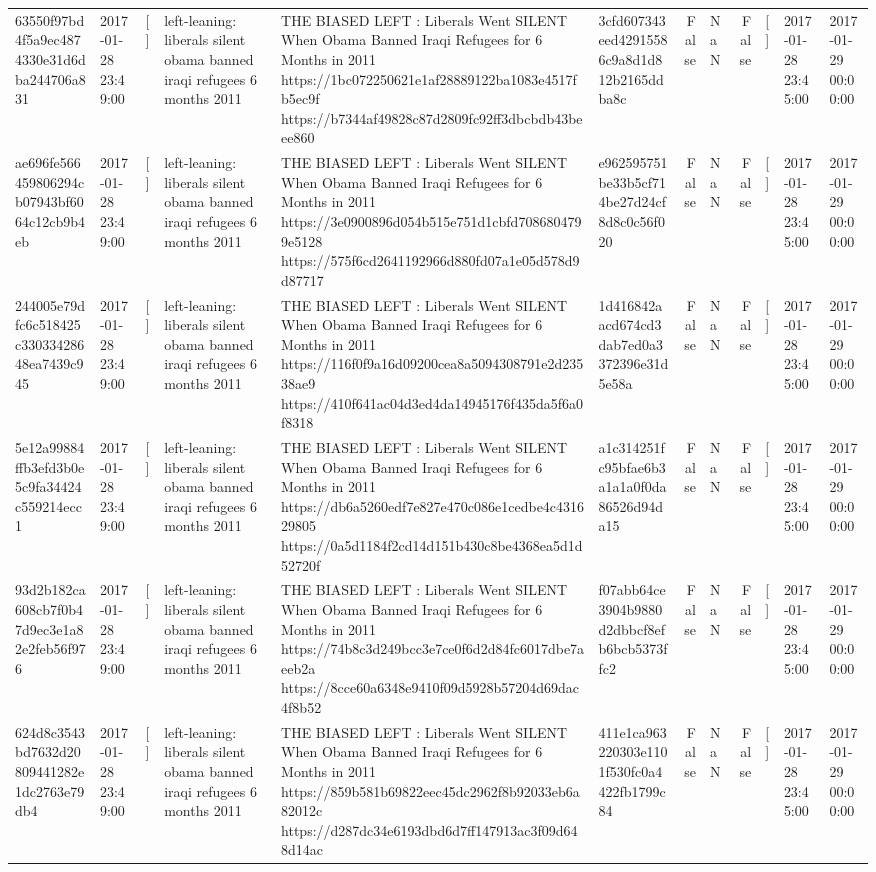 \begin{tabular}{llllllrlrlll}
63550f97bd4f5a9ec4874330e31d6dba244706a831 & 2017-01-28 23:49:00 & [] & left-leaning: liberals silent obama banned iraqi refugees 6 months 2011 & THE BIASED LEFT : Liberals Went SILENT When Obama Banned Iraqi Refugees for 6 Months in 2011 https://1bc072250621e1af28889122ba1083e4517fb5ec9f https://b7344af49828c87d2809fc92ff3dbcbdb43beee860 & 3cfd607343eed42915586c9a8d1d812b2165ddba8c & False & NaN & False & [] & 2017-01-28 23:45:00 & 2017-01-29 00:00:00 \\
ae696fe566459806294cb07943bf6064c12cb9b4eb & 2017-01-28 23:49:00 & [] & left-leaning: liberals silent obama banned iraqi refugees 6 months 2011 & THE BIASED LEFT : Liberals Went SILENT When Obama Banned Iraqi Refugees for 6 Months in 2011 https://3e0900896d054b515e751d1cbfd7086804799e5128 https://575f6cd2641192966d880fd07a1e05d578d9d87717 & e962595751be33b5cf714be27d24cf8d8c0c56f020 & False & NaN & False & [] & 2017-01-28 23:45:00 & 2017-01-29 00:00:00 \\
244005e79dfc6c518425c33033428648ea7439c945 & 2017-01-28 23:49:00 & [] & left-leaning: liberals silent obama banned iraqi refugees 6 months 2011 & THE BIASED LEFT : Liberals Went SILENT When Obama Banned Iraqi Refugees for 6 Months in 2011 https://116f0f9a16d09200cea8a5094308791e2d23538ae9 https://410f641ac04d3ed4da14945176f435da5f6a0f8318 & 1d416842aacd674cd3dab7ed0a3372396e31d5e58a & False & NaN & False & [] & 2017-01-28 23:45:00 & 2017-01-29 00:00:00 \\
5e12a99884ffb3efd3b0e5c9fa34424c559214ecc1 & 2017-01-28 23:49:00 & [] & left-leaning: liberals silent obama banned iraqi refugees 6 months 2011 & THE BIASED LEFT : Liberals Went SILENT When Obama Banned Iraqi Refugees for 6 Months in 2011 https://db6a5260edf7e827e470c086e1cedbe4c431629805 https://0a5d1184f2cd14d151b430c8be4368ea5d1d52720f & a1c314251fc95bfae6b3a1a1a0f0da86526d94da15 & False & NaN & False & [] & 2017-01-28 23:45:00 & 2017-01-29 00:00:00 \\
93d2b182ca608cb7f0b47d9ec3e1a82e2feb56f976 & 2017-01-28 23:49:00 & [] & left-leaning: liberals silent obama banned iraqi refugees 6 months 2011 & THE BIASED LEFT : Liberals Went SILENT When Obama Banned Iraqi Refugees for 6 Months in 2011 https://74b8c3d249bcc3e7ce0f6d2d84fc6017dbe7aeeb2a https://8cce60a6348e9410f09d5928b57204d69dac4f8b52 & f07abb64ce3904b9880d2dbbcf8efb6bcb5373ffc2 & False & NaN & False & [] & 2017-01-28 23:45:00 & 2017-01-29 00:00:00 \\
624d8c3543bd7632d20809441282e1dc2763e79db4 & 2017-01-28 23:49:00 & [] & left-leaning: liberals silent obama banned iraqi refugees 6 months 2011 & THE BIASED LEFT : Liberals Went SILENT When Obama Banned Iraqi Refugees for 6 Months in 2011 https://859b581b69822eec45dc2962f8b92033eb6a82012c https://d287dc34e6193dbd6d7ff147913ac3f09d648d14ac & 411e1ca963220303e1101f530fc0a4422fb1799c84 & False & NaN & False & [] & 2017-01-28 23:45:00 & 2017-01-29 00:00:00 \\

\end{tabular}
